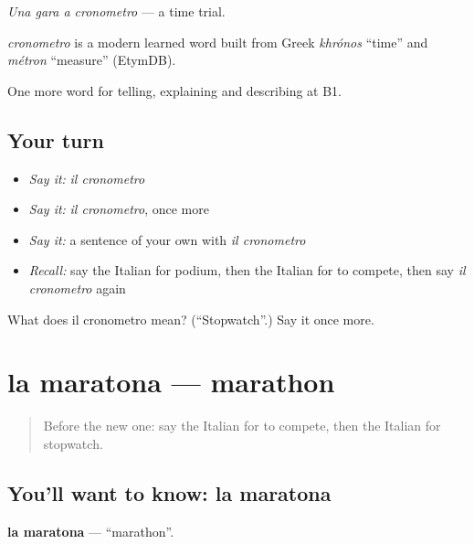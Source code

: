 \emph{Una gara a cronometro} — a time trial.

\begin{cousinweb}
\emph{cronometro} is a modern learned word built from Greek \emph{khrónos} \textquotedblleft{}time\textquotedblright{} and \emph{métron} \textquotedblleft{}measure\textquotedblright{} (EtymDB).
\end{cousinweb}

\begin{grammarlens}[title={What you've built}]
One more word for telling, explaining and describing at B1.
\end{grammarlens}

\subsection*{Your turn}
\begin{itemize}
\raggedright
  \item \emph{Say it:} \emph{il cronometro}
  \item \emph{Say it:} \emph{il cronometro}, once more
  \item \emph{Say it:} a sentence of your own with \emph{il cronometro}
  \item \emph{Recall:} say the Italian for podium, then the Italian for to compete, then say \emph{il cronometro} again
\end{itemize}

\begin{tcolorbox}[breakable,colback=teal!4,colframe=teal!35!black,title={Before you move on}]
What does il cronometro mean? (\textquotedblleft{}Stopwatch\textquotedblright{}.) Say it once more.
\end{tcolorbox}
\section[la maratona]{la maratona — marathon}

\label{lesson:IT-C513-maratona}



\begin{quote}
Before the new one: say the Italian for to compete, then the Italian for stopwatch.
\end{quote}

\subsection*{You'll want to know: la maratona}
\textbf{la maratona} — \textquotedblleft{}marathon\textquotedblright{}.

